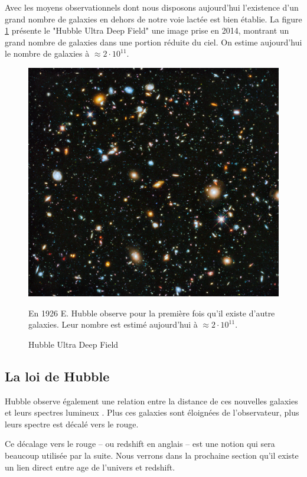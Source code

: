 Avec les moyens observationnels dont nous disposons aujourd'hui l’existence d'un grand nombre de galaxies en dehors de notre voie lactée est bien établie.
La figure \ref{fig:hubbl_deep_field} présente le "Hubble Ultra Deep Field" \citep{1538-3881-132-5-1729} une image prise en 2014, montrant un grand nombre de galaxies dans une portion réduite du ciel.
On estime aujourd'hui le nombre de galaxies à $\approx 2 \cdot 10^{11}$.


\begin{figure}[bth]
        \includegraphics[width=.9\linewidth]{img/01/hudf.jpeg} 
        \caption{Hubble Ultra Deep Field} 
		En 1926 E. Hubble observe pour la première fois qu'il existe d'autre galaxies.
		Leur nombre est estimé aujourd'hui à $\approx 2 \cdot 10^{11}$.
 		\label{fig:hubbl_deep_field}
\end{figure}

\subsection{La loi de Hubble}
Hubble observe également une relation entre la distance de ces nouvelles galaxies et leurs spectres lumineux \citep{1929CoMtW...3...23H}.
Plus ces galaxies sont éloignées de l'observateur, plus leurs spectre est décalé vers le rouge.

Ce décalage vers le rouge -- ou redshift en anglais -- est une notion qui sera beaucoup utilisée par la suite.
Nous verrons dans la prochaine section qu'il existe un lien direct entre age de l'univers et redshift.

